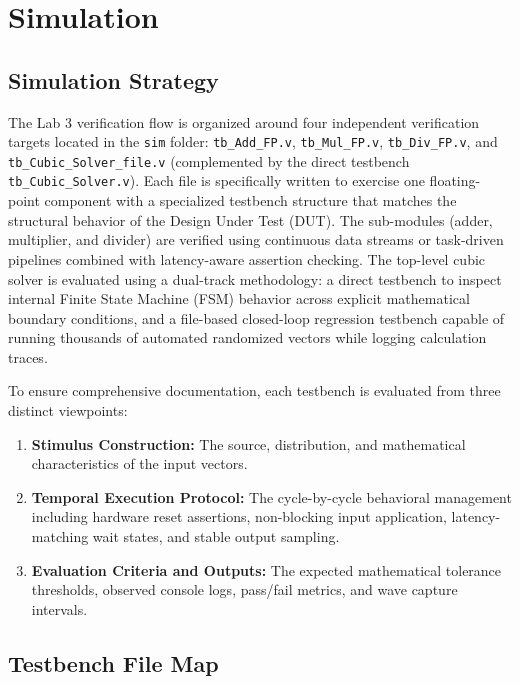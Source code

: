 \section{Simulation}

\subsection{Simulation Strategy}

The Lab 3 verification flow is organized around four independent verification targets located in the \texttt{sim} folder: \texttt{tb\_Add\_FP.v}, \texttt{tb\_Mul\_FP.v}, \texttt{tb\_Div\_FP.v}, and \texttt{tb\_Cubic\_Solver\_file.v} (complemented by the direct testbench \texttt{tb\_Cubic\_Solver.v}). Each file is specifically written to exercise one floating-point component with a specialized testbench structure that matches the structural behavior of the Design Under Test (DUT). The sub-modules (adder, multiplier, and divider) are verified using continuous data streams or task-driven pipelines combined with latency-aware assertion checking. The top-level cubic solver is evaluated using a dual-track methodology: a direct testbench to inspect internal Finite State Machine (FSM) behavior across explicit mathematical boundary conditions, and a file-based closed-loop regression testbench capable of running thousands of automated randomized vectors while logging calculation traces.

To ensure comprehensive documentation, each testbench is evaluated from three distinct viewpoints:
\begin{enumerate}
    \item \textbf{Stimulus Construction:} The source, distribution, and mathematical characteristics of the input vectors.
    \item \textbf{Temporal Execution Protocol:} The cycle-by-cycle behavioral management including hardware reset assertions, non-blocking input application, latency-matching wait states, and stable output sampling.
    \item \textbf{Evaluation Criteria and Outputs:} The expected mathematical tolerance thresholds, observed console logs, pass/fail metrics, and wave capture intervals.
\end{enumerate}

\subsection{Testbench File Map}

